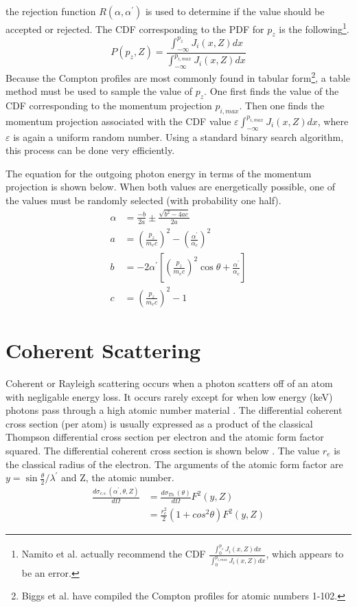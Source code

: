 the rejection function $R(\alpha,\alpha^{'})$ is used to determine if the value 
should be accepted or rejected. The CDF corresponding to the PDF for $p_z$ is 
the following\footnote{Namito et al. actually recommend the CDF $\frac{\int_{0}^{p_z}J_i(x,Z)dx}{\int_{0}^{p_{i,max}}J_i(x,Z)dx}$, which appears to be an error.}.
\begin{equation}
P(p_z,Z) = \frac{\int_{-\infty}^{p_z}J_i(x,Z)dx}{\int_{-\infty}^{p_{i,max}}J_i(x,Z)dx}
\end{equation}
Because the Compton profiles are most commonly found in tabular form\footnote{Biggs et al. have compiled the Compton profiles for atomic numbers 1-102\citep{biggs_hartree-fock_1975}.}, a table method must be used to sample the value of 
$p_z$. One first finds the value of the CDF corresponding to the momentum 
projection $p_{i,max}$. Then one finds the momentum projection associated with 
the CDF value $\varepsilon\int_{-\infty}^{p_{i,max}}J_i(x,Z)dx$, where $\varepsilon$ 
is again a uniform random number. Using a standard binary search algorithm, 
this process can be done very efficiently.

The equation for the outgoing photon energy in terms of the momentum projection
is shown below. When both values are energetically possible, one of the values
must be randomly selected (with probability one half).
\begin{align}
  \alpha & = \frac{-b}{2a} \pm \frac{\sqrt{b^2 - 4ac}}{2a} \\
  a & = \left(\frac{p_z}{m_ec}\right)^2 - 
  \left(\frac{\alpha^{'}}{\alpha_c}\right)^2
  \nonumber \\
  b & = -2\alpha^{'}\left[\left(\frac{p_z}{m_ec}\right)^2\cos{\theta} + 
  \frac{\alpha^{'}}{\alpha_c}\right] \nonumber \\
  c & = \left(\frac{p_z}{m_ec}\right)^2 - 1 \nonumber
\end{align}


\section{Coherent Scattering}
Coherent or Rayleigh scattering occurs when a photon scatters off of an atom 
with negligable energy loss. It occurs rarely except for when low energy (keV)
photons pass through a high atomic number material 
\citep{lux_monte_1991}. The differential coherent cross section (per atom) is 
usually expressed as a product of the classical Thompson differential 
cross section per electron and the atomic form factor squared. The differential 
coherent cross section is shown below \citep{lux_monte_1991}. The value $r_e$ 
is the classical radius of the electron. The arguments of the atomic form factor
are $y = \sin{\frac{\theta}{2}}/\lambda^{'}$ and Z, the atomic number. 
\begin{align}
  \frac{d\sigma_{c.s.}(\alpha^{'},\theta,Z)}{d\Omega} & = 
  \frac{d\sigma_{Th.}(\theta)}{d\Omega}F^2(y,Z) \nonumber \\
  & = \frac{r_e^2}{2}(1 + cos^2\theta)F^2(y,Z)
\end{align}


